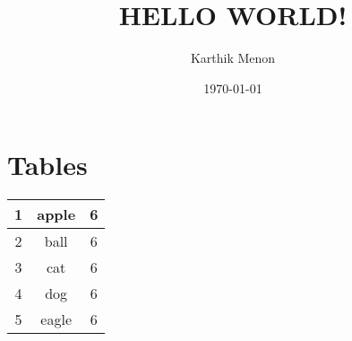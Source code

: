 \documentclass[a4paper, 12pt]{article}
\begin{document}
\title{HELLO WORLD!}
\author{Karthik Menon}
\date{\today}
\maketitle
\newpage
\section{Tables}
	\begin{tabular}{|c|c|c|}
	\hline
		1 & apple & 6 \\
		\hline
		2 & ball & 6  \\
		\hline
		3 & cat & 6  \\
		\hline
		4 & dog & 6  \\
		\hline
		5 & eagle & 6  \\
	\hline
	\end{tabular}
\end{document}
